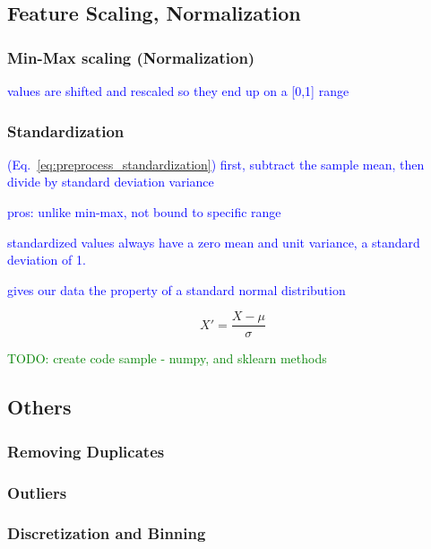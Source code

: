 \subsection{Feature Scaling, Normalization}

\subsubsection{Min-Max scaling (Normalization)}

\textcolor{blue}{values are shifted and rescaled so they end up on a [0,1] range}

\subsubsection{Standardization}

\textcolor{blue}{(Eq.~\ref{eq:preprocess_standardization}) first, subtract the sample mean, then divide by standard deviation variance}

\textcolor{blue}{pros: unlike min-max, not bound to specific range}

\textcolor{blue}{standardized values always have a zero mean and unit variance, a standard deviation of 1.}

\textcolor{blue}{gives our data the property of a standard normal distribution}

\begin{equation}
{X' = \frac{X - \mu}{\sigma}}
\label{eq:preprocess_standardization}
\end{equation}

\textcolor{green}{TODO: create code sample - numpy, and sklearn methods}


\subsection{Others}

\subsubsection{Removing Duplicates}

\subsubsection{Outliers}

\subsubsection{Discretization and Binning}
